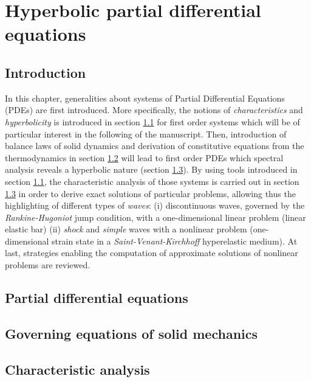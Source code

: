 \chapter{Hyperbolic partial differential equations}
\newpage
\section*{Introduction}
In this chapter, generalities about systems of Partial Differential Equations (PDEs) are first introduced. More specifically, the notions of \textit{characteristics} and \textit{hyperbolicity} is introduced in section \ref{sec:PDEs} for first order systems which will be of particular interest in the following of the manuscript.
Then, introduction of balance laws of solid dynamics and derivation of constitutive equations from the thermodynamics in section \ref{sec:solidMech_equations} will lead to first order PDEs which spectral analysis reveals a hyperbolic nature (section \ref{sec:characteristic_analysis}). By using tools introduced in section \ref{sec:PDEs}, the characteristic analysis of those systems is carried out in section \ref{sec:characteristic_analysis} in order to derive exact solutions of particular problems, allowing thus the highlighting of different types of \textit{waves}: (i) discontinuous waves, governed by the \textit{Rankine-Hugoniot} jump condition, with a one-dimensional linear problem (linear elastic bar) (ii) \textit{shock} and \textit{simple} waves with a nonlinear problem (one-dimensional strain state in a \textit{Saint-Venant-Kirchhoff} hyperelastic medium). At last, strategies enabling the computation of approximate solutions of nonlinear problems are reviewed.


\section{Partial differential equations}
\label{sec:PDEs}


\section{Governing equations of solid mechanics}
\label{sec:solidMech_equations}



\section{Characteristic analysis}
\label{sec:characteristic_analysis}



